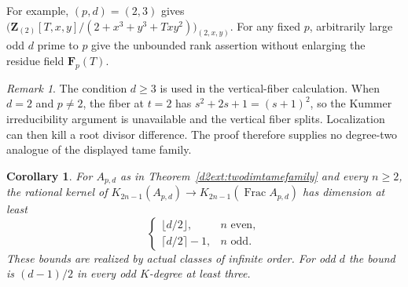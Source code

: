 \documentclass[11pt,a4paper]{amsart}
\numberwithin{equation}{section}
\newtheorem{corollary}[theorem]{Corollary}
\theoremstyle{definition}
\theoremstyle{remark}
\newtheorem{remark}[theorem]{Remark}
\newcommand{\Z}{\mathbf Z}
\newcommand{\F}{\mathbf F}
\newcommand{\Frac}{\operatorname{Frac}}
\begin{document}
For example, $(p,d)=(2,3)$ gives
$\bigl(\Z_{(2)}[T,x,y]/(2+x^3+y^3+Txy^2)\bigr)_{(2,x,y)}$.
For any fixed $p$, arbitrarily large odd $d$ prime to $p$ give
the unbounded rank assertion without enlarging the residue
field $\F_p(T)$. 

\begin{remark}
The condition $d\ge3$ is used in the vertical-fiber calculation.
When $d=2$ and $p\ne2$, the fiber at $t=2$ has
$s^2+2s+1=(s+1)^2$, so the Kummer irreducibility argument is
unavailable and the vertical fiber splits. Localization can then
kill a root divisor difference. The proof therefore supplies no
degree-two analogue of the displayed tame family.
\end{remark}

\begin{corollary}
\label{d2ext:twodimtameallodd}
For $A_{p,d}$ as in Theorem~\ref{d2ext:twodimtamefamily} and every
$n\ge2$, the rational kernel of
$K_{2n-1}(A_{p,d})\to K_{2n-1}(\Frac A_{p,d})$ has dimension at least
\[
 \begin{cases}
 \lfloor d/2\rfloor,&n\text{ even},\\
 \lceil d/2\rceil-1,&n\text{ odd}.
 \end{cases}
\]
These bounds are realized by actual classes of infinite order.
For odd $d$ the bound is $(d-1)/2$ in every odd $K$-degree at least three.
\end{corollary}
\end{document}
